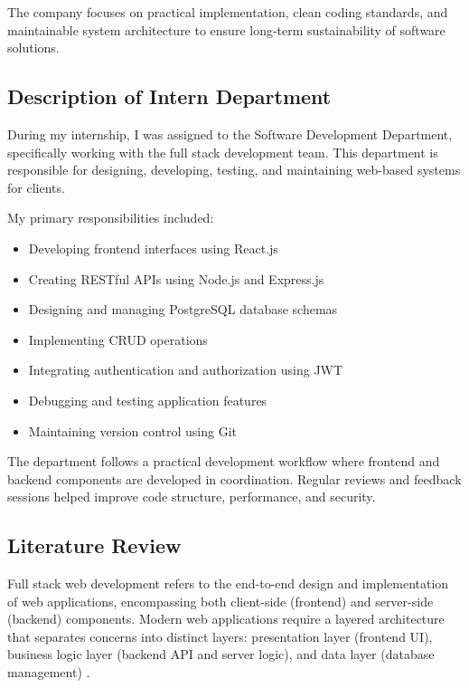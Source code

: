 The company focuses on practical implementation, clean coding standards, and maintainable system architecture to ensure long-term sustainability of software solutions.

\subsection{Description of Intern Department}

During my internship, I was assigned to the Software Development Department, specifically working with the full stack development team. This department is responsible for designing, developing, testing, and maintaining web-based systems for clients.

My primary responsibilities included:

\begin{itemize}
    \item Developing frontend interfaces using React.js
    \item Creating RESTful APIs using Node.js and Express.js
    \item Designing and managing PostgreSQL database schemas
    \item Implementing CRUD operations
    \item Integrating authentication and authorization using JWT
    \item Debugging and testing application features
    \item Maintaining version control using Git
\end{itemize}

The department follows a practical development workflow where frontend and backend components are developed in coordination. Regular reviews and feedback sessions helped improve code structure, performance, and security.

\subsection{Literature Review}

Full stack web development refers to the end-to-end design and implementation of web applications, encompassing both client-side (frontend) and server-side (backend) components. Modern web applications require a layered architecture that separates concerns into distinct layers: presentation layer (frontend UI), business logic layer (backend API and server logic), and data layer (database management) \parencite{Newman2015}.

